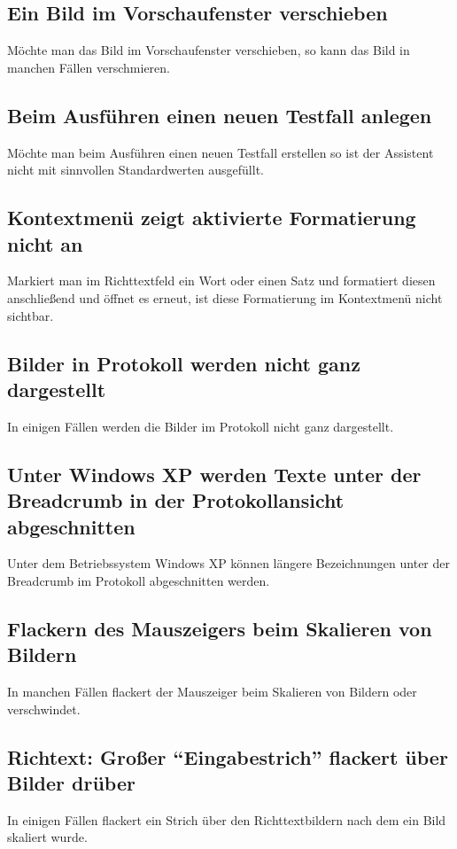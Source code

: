 \documentclass[11pt,a4paper,titlepage]{article}
\begin{document}
\subsection*{Ein Bild im Vorschaufenster verschieben}
Möchte man das Bild im Vorschaufenster verschieben, so kann das Bild in manchen Fällen verschmieren.

\subsection*{Beim Ausführen einen neuen Testfall anlegen}
Möchte man beim Ausführen einen neuen Testfall erstellen so ist der Assistent nicht mit sinnvollen Standardwerten ausgefüllt.

\subsection*{Kontextmenü zeigt aktivierte Formatierung nicht an}
Markiert man im Richttextfeld ein Wort oder einen Satz und formatiert diesen anschließend und öffnet es erneut, ist diese Formatierung im Kontextmenü nicht sichtbar.

\subsection*{Bilder in Protokoll werden nicht ganz dargestellt}
In einigen Fällen werden die Bilder im Protokoll nicht ganz dargestellt.

\subsection*{Unter Windows XP werden Texte unter der Breadcrumb in der Protokollansicht abgeschnitten}
Unter dem Betriebssystem Windows XP können längere Bezeichnungen unter der Breadcrumb im Protokoll abgeschnitten werden.

\subsection*{Flackern des Mauszeigers beim Skalieren von Bildern}
In manchen Fällen flackert der Mauszeiger beim Skalieren von Bildern oder verschwindet.

\subsection*{Richtext: Großer "`Eingabestrich"' flackert über Bilder drüber}
In einigen Fällen flackert ein Strich über den Richttextbildern nach dem ein Bild skaliert wurde.
\end{document}
